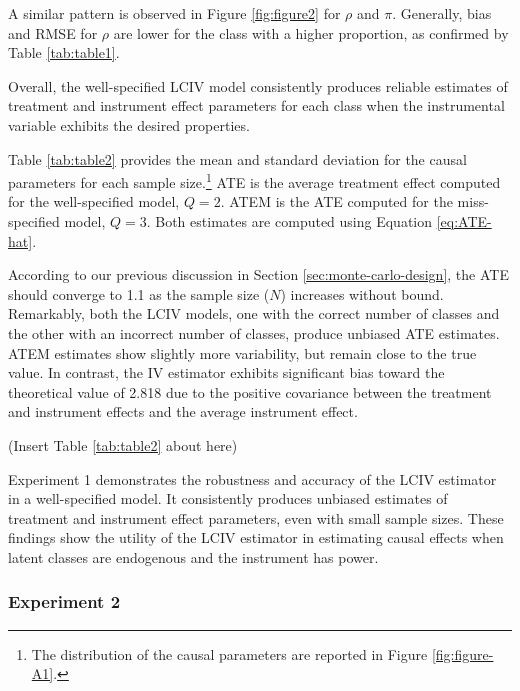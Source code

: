 \documentclass[12pt]{article}
\begin{document}
A similar pattern is observed in Figure \ref{fig:figure2} for $\rho$ and $\pi$. Generally, bias and RMSE for $\rho$ are lower for the class with a higher proportion, as confirmed by Table \ref{tab:table1}. 

Overall, the well-specified LCIV model consistently produces reliable estimates of treatment and instrument effect parameters for each class when the instrumental variable exhibits the desired properties. %

Table \ref{tab:table2} provides the mean and standard deviation for the causal parameters for each sample size.\footnote{The distribution of the causal parameters are reported in Figure \ref{fig:figure-A1}.} ATE is the average treatment effect computed for the well-specified model, $Q = 2$. ATEM is the ATE computed for the miss-specified model, $Q = 3$. Both estimates are computed using Equation \eqref{eq:ATE-hat}. 

According to our previous discussion in Section \ref{sec:monte-carlo-design}, the ATE should converge to 1.1 as the sample size ($N$) increases without bound. Remarkably, both the LCIV models, one with the correct number of classes and the other with an incorrect number of classes, produce unbiased ATE estimates. ATEM estimates show slightly more variability, but remain close to the true value. In contrast, the IV estimator exhibits significant bias toward the theoretical value of 2.818 due to the positive covariance between the treatment and instrument effects and the average instrument effect.

\begin{center}
	(Insert Table \ref{tab:table2} about here)
\end{center}

Experiment 1 demonstrates the robustness and accuracy of the LCIV estimator in a well-specified model. It consistently produces unbiased estimates of treatment and instrument effect parameters, even with small sample sizes. These findings show the utility of the LCIV estimator in estimating causal effects when latent classes are endogenous and the instrument has power.

\subsubsection{Experiment 2}
\end{document}
